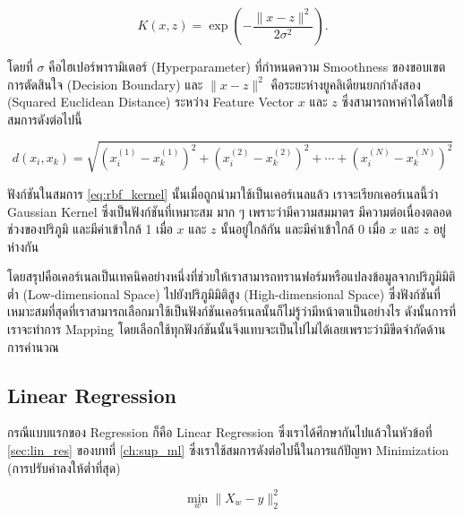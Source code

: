 \begin{equation}\label{eq:rbf_kernel}
    K(x,z) = \exp\left(-\frac{\lVert x - z \rVert^2}{2\sigma^2}\right).    
\end{equation}

\noindent โดยที่ $\sigma$ คือไฮเปอร์พารามิเตอร์ (Hyperparameter) ที่กำหนดความ Smoothness ของขอบเขตการตัดสินใจ (Decision 
Boundary) และ $\lVert x - z \rVert^2$ คือระยะห่างยูคลิเดียนยกกำลังสอง (Squared Euclidean Distance) ระหว่าง Feature 
Vector $x$ และ $z$ ซึ่งสามารถหาค่าได้โดยใช้สมการดังต่อไปนี้

\begin{equation}
    d(x_{i}, x_{k}) = 
    \sqrt{(x^{(1)}_{i} - x^{(1)}_{k})^{2} + (x^{(2)}_{i} - x^{(2)}_{k})^{2} + \cdots + 
    (x^{(N)}_{i} - x^{(N)}_{k})^{2}}
\end{equation}

ฟังก์ชันในสมการ \ref{eq:rbf_kernel} นั้นเมื่อถูกนำมาใช้เป็นเคอร์เนลแล้ว เราจะเรียกเคอร์เนลนี้ว่า Gaussian Kernel ซึ่งเป็นฟังก์ชันที่เหมาะสม%
มาก ๆ เพราะว่ามีความสมมาตร มีความต่อเนื่องตลอดช่วงของปริภูมิ และมีค่าเข้าใกล้ 1 เมื่อ $x$ และ $z$ นั้นอยู่ใกล้กัน และมีค่าเข้าใกล้ 0 เมื่อ 
$x$ และ $z$ อยู่ห่างกัน

 โดยสรุปคือเคอร์เนลเป็นเทคนิคอย่างหนึ่งที่ช่วยให้เราสามารถทรานฟอร์มหรือแปลงข้อมูลจากปริภูมิมิติต่ำ (Low-dimensional Space) ไปยังปริภูมิมิติสูง
 (High-dimensional Space) ซึ่งฟังก์ชันที่เหมาะสมที่สุดที่เราสามารถเลือกมาใช้เป็นฟังก์ชันเคอร์เนลนั้นก็ไม่รู้ว่ามีหน้าตาเป็นอย่างไร ดังนั้นการที่%
 เราจะทำการ Mapping โดยเลือกใช้ทุกฟังก์ชันนั้นจึงแทบจะเป็นไปไม่ได้เลยเพราะว่ามีขีดจำกัดด้านการคำนวณ

\subsection{Linear Regression}

กรณีแบบแรกของ Regression ก็คือ Linear Regression ซึ่งเราได้ศึกษากันไปแล้วในหัวข้อที่ \ref{sec:lin_res} ของบทที่ \ref{ch:sup_ml}
ซึ่งเราใช้สมการดังต่อไปนี้ในการแก้ปัญหา Minimization (การปรับค่าลงให้ต่ำที่สุด)

\begin{equation}
    \min_{w} \lVert X_{w} - y \rVert_{2}^{2}
\end{equation}

